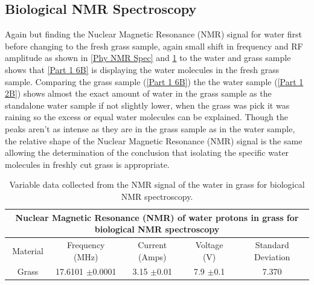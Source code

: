 \documentclass[12pt]{article}
\begin{document}
\subsection{Biological NMR Spectroscopy}
\label{Biological NMR Spectroscopy SubSection}

Again but finding the Nuclear Magnetic Resonance (NMR) signal for water first before changing to the fresh grass sample, again small shift in frequency and RF amplitude as shown in \cref{Phy NMR Spec} and \cref{Bio NMR Spec} to the water and grass sample shows that \cref{Part 1 6B} is displaying the water molecules in the fresh grass sample. Comparing the grass sample (\cref{Part 1 6B}) the the water sample (\cref{Part 1 2B}) shows almost the exact amount of water in the grass sample as the standalone water sample if not slightly lower, when the grass was pick it was raining so the excess or equal water molecules can be explained. Though the peaks aren't as intense as they are in the grass sample as in the water sample, the relative shape of the Nuclear Magnetic Resonance (NMR) signal is the same allowing the determination of the conclusion that isolating the specific water molecules in freshly cut grass is appropriate. \\ 

\begin{table}[H]
\begin{center}
 \footnotesize
 \begin{tabular}{|c||c||c||c||c|}
 \hline
 \multicolumn{5}{|c|}{Nuclear Magnetic Resonance (NMR) of water protons in grass for biological NMR spectroscopy} \\
 \hline
 Material & Frequency (MHz)  & Current (Amps)  & Voltage (V) & Standard Deviation \\
 \hline \hline
 Grass & 17.6101 $\pm$0.0001  & 3.15 $\pm$0.01  & 7.9 $\pm$0.1 & 7.370\\
 \hline
 \end{tabular} \\ 
 \caption{Variable data collected from the NMR signal of the water in grass for biological NMR spectroscopy.}
 \label{Bio NMR Spec}
\end{center}
\end{table}
\end{document}
